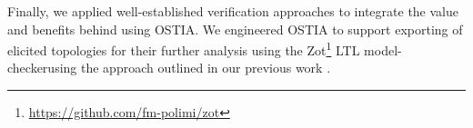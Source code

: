 Finally, we applied well-established verification approaches to integrate the value and benefits behind using OSTIA. We engineered OSTIA to support exporting of elicited topologies for their further analysis using the Zot\footnote{\url{https://github.com/fm-polimi/zot}} LTL model-checkerusing the approach outlined in our previous work \cite{icsoft}.

